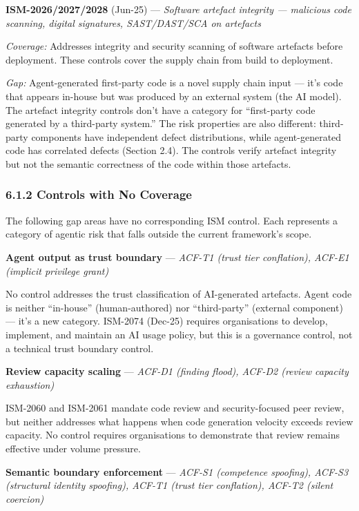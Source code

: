 \documentclass[a4paper,11pt]{report}
\begin{document}
\textbf{ISM-2026/2027/2028} (Jun-25) --- \emph{Software artefact
integrity --- malicious code scanning, digital signatures, SAST/DAST/SCA
on artefacts}

\emph{Coverage:} Addresses integrity and security scanning of software
artefacts before deployment. These controls cover the supply chain from
build to deployment.

\emph{Gap:} Agent-generated first-party code is a novel supply chain
input --- it's code that appears in-house but was produced by an
external system (the AI model). The artefact integrity controls don't
have a category for ``first-party code generated by a third-party
system.'' The risk properties are also different: third-party components
have independent defect distributions, while agent-generated code has
correlated defects (Section 2.4). The controls verify artefact integrity
but not the semantic correctness of the code within those artefacts.

\hypertarget{controls-with-no-coverage}{%
\subsubsection{6.1.2 Controls with No
Coverage}\label{controls-with-no-coverage}}

The following gap areas have no corresponding ISM control. Each
represents a category of agentic risk that falls outside the current
framework's scope.

\textbf{Agent output as trust boundary} --- \emph{ACF-T1 (trust tier
conflation), ACF-E1 (implicit privilege grant)}

No control addresses the trust classification of AI-generated artefacts.
Agent code is neither ``in-house'' (human-authored) nor ``third-party''
(external component) --- it's a new category. ISM-2074 (Dec-25) requires
organisations to develop, implement, and maintain an AI usage policy,
but this is a governance control, not a technical trust boundary
control.

\textbf{Review capacity scaling} --- \emph{ACF-D1 (finding flood),
ACF-D2 (review capacity exhaustion)}

ISM-2060 and ISM-2061 mandate code review and security-focused peer
review, but neither addresses what happens when code generation velocity
exceeds review capacity. No control requires organisations to
demonstrate that review remains effective under volume pressure.

\textbf{Semantic boundary enforcement} --- \emph{ACF-S1 (competence
spoofing), ACF-S3 (structural identity spoofing), ACF-T1 (trust tier
conflation), ACF-T2 (silent coercion)}
\end{document}
